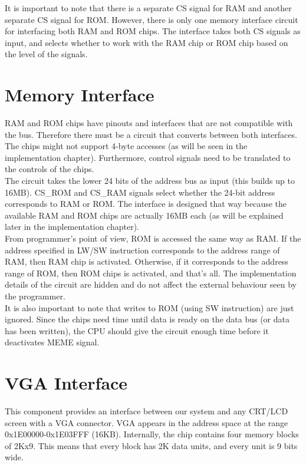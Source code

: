 \documentclass[oneside]{book}
\begin{document}
It is important to note that there is a separate CS signal for RAM and
another separate CS signal for ROM. However, there is only one memory
interface circuit for interfacing both RAM and ROM chips. The interface
takes both CS signals as input, and selects whether to work with the
RAM chip or ROM chip based on the level of the signals.

\section{Memory Interface}

RAM and ROM chips have pinouts and interfaces that are not compatible
with the bus. Therefore there must be a circuit that converts between
both interfaces. The chips might not support 4-byte accesses (as will
be seen in the implementation chapter). Furthermore, control signals
need to be translated to the controls of the chips.\\

The circuit takes the lower 24 bits of the address bus as input (this
builds up to 16MB). CS\_ROM and CS\_RAM signals select whether the
24-bit address corresponds to RAM or ROM. The interface is designed that
way because the available RAM and ROM chips are actually 16MB each (as
will be explained later in the implementation chapter).\\

From programmer's point of view, ROM is accessed the same way as RAM.
If the address specified in LW/SW instruction corresponds to the
address range of RAM, then RAM chip is activated. Otherwise, if it
corresponds to the address range of ROM, then ROM chips is activated,
and that's all. The implementation details of the circuit are hidden
and do not affect the external behaviour seen by the programmer.\\

It is also important to note that writes to ROM (using SW instruction) are
just ignored. Since the chips need time until data is ready on
the data bus (or data has been written), the CPU should give the
circuit enough time before it deactivates MEME signal.

\section{VGA Interface}

This component provides an interface between our system and any CRT/LCD
screen with a VGA connector. VGA appears in the address space at the
range 0x1E00000-0x1E03FFF (16KB). Internally, the chip contains four
memory blocks of 2Kx9. This means that every block has 2K data units,
and every unit is 9 bits wide.\\
\end{document}
